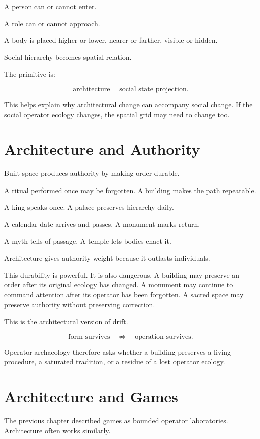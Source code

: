\documentclass[11pt]{book}
\begin{document}
A person can or cannot enter.

A role can or cannot approach.

A body is placed higher or lower, nearer or farther, visible or hidden.

Social hierarchy becomes spatial relation.

The primitive is:

\[
\text{architecture} = \text{social state projection}.
\]

This helps explain why architectural change can accompany social change. If the social operator ecology changes, the spatial grid may need to change too.

\section{Architecture and Authority}

Built space produces authority by making order durable.

A ritual performed once may be forgotten. A building makes the path repeatable.

A king speaks once. A palace preserves hierarchy daily.

A calendar date arrives and passes. A monument marks return.

A myth tells of passage. A temple lets bodies enact it.

Architecture gives authority weight because it outlasts individuals.

This durability is powerful. It is also dangerous. A building may preserve an order after its original ecology has changed. A monument may continue to command attention after its operator has been forgotten. A sacred space may preserve authority without preserving correction.

This is the architectural version of drift.

\[
\text{form survives} \quad \not\Rightarrow \quad \text{operation survives}.
\]

Operator archaeology therefore asks whether a building preserves a living procedure, a saturated tradition, or a residue of a lost operator ecology.

\section{Architecture and Games}

The previous chapter described games as bounded operator laboratories. Architecture often works similarly.
\end{document}
